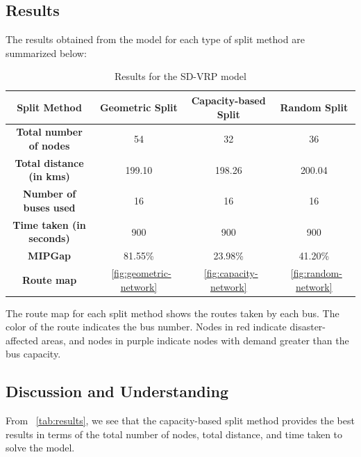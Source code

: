 \documentclass[12pt]{article}
\begin{document}
\subsection{Results}
The results obtained from the model for each type of split method are summarized below:

\begin{table}[htbp]
    \centering
    \begin{tabular}{|c|c|c|c|}
        \hline
        \textbf{Split Method}            & \textbf{Geometric Split}         & \textbf{Capacity-based Split}   & \textbf{Random Split}         \\
        \hline
        \textbf{Total number of nodes}   & 54                               & 32                              & 36                            \\
        \hline
        \textbf{Total distance (in kms)} & 199.10                           & 198.26                          & 200.04                        \\
        \hline
        \textbf{Number of buses used}    & 16                               & 16                              & 16                            \\
        \hline
        \textbf{Time taken (in seconds)} & 900                              & 900                             & 900                           \\
        \hline
        \textbf{MIPGap}                  & 81.55\%                          & 23.98\%                         & 41.20\%                       \\
        \hline
        \textbf{Route map}               & ~\autoref{fig:geometric-network} & ~\autoref{fig:capacity-network} & ~\autoref{fig:random-network} \\
        \hline
    \end{tabular}
    \caption{Results for the SD-VRP model}
    \label{tab:results}
\end{table}

The route map for each split method shows the routes taken by each bus.
The color of the route indicates the bus number.
Nodes in red indicate disaster-affected areas,
and nodes in purple indicate nodes with demand greater than the bus capacity.

\subsection{Discussion and Understanding}
From ~\autoref{tab:results}, we see that
the capacity-based split method provides the best results in terms of the total number of nodes, total distance, and time taken to solve the model.
\end{document}
